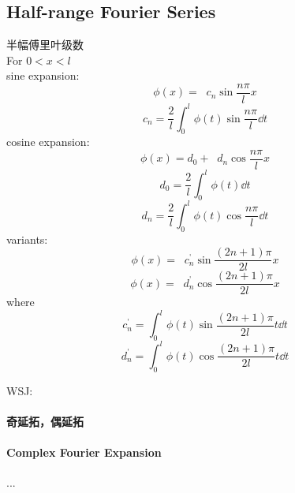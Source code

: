 \documentclass[UTF8]{ctexart} %
\DeclareMathOperator{\p}{\prime}
\DeclareMathOperator{\s}{\sum_{n=1}^{\infty}}
\numberwithin{equation}{section}
\begin{document}
\subsection{Half-range Fourier Series}
半幅傅里叶级数\\
For $0<x<l$\\
sine expansion:
\begin{equation}\label{key}
\phi(x)=\s c_n \sin\dfrac{n\pi}{l}x
\end{equation}
\begin{equation}\label{key}
c_n=\dfrac{2}{l}\int_{0}^{l}\phi(t)\sin\dfrac{n\pi}{l}\dd t
\end{equation}
cosine expansion:
\begin{equation}\label{key}
\phi(x)=d_0+ \s d_n \cos\dfrac{n\pi}{l}x
\end{equation}
\begin{equation}\label{key}
d_0=\dfrac{2}{l}\int_{0}^{l}\phi(t)\dd t
\end{equation}
\begin{equation}\label{key}
d_n=\dfrac{2}{l}\int_{0}^{l}\phi(t)\cos\dfrac{n\pi}{l}\dd t
\end{equation}
variants:
\begin{equation}\label{key}
\phi(x)=\s c_n^{\p} \sin\dfrac{(2n+1)\pi}{2l}x
\end{equation}
\begin{equation}\label{key}
\phi(x)=\s d_n^{\p} \cos\dfrac{(2n+1)\pi}{2l}x
\end{equation}
where
\begin{equation}\label{key}
c_n^{\p} =\int_0^l \phi(t)\sin\dfrac{(2n+1)\pi}{2l}t\dd t
\end{equation}
\begin{equation}\label{key}
d_n^{\p} =\int_0^l \phi(t)\cos\dfrac{(2n+1)\pi}{2l}t\dd t
\end{equation}

WSJ:\\
\paragraph{奇延拓，偶延拓}
\paragraph{Complex Fourier Expansion}
...\\
\end{document}
